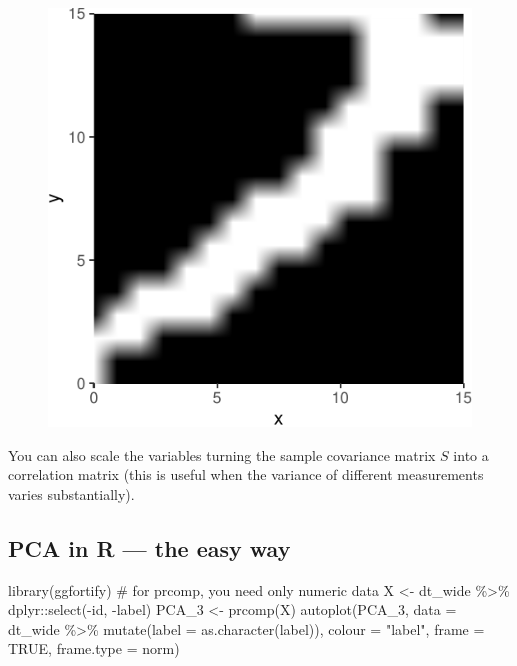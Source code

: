 \documentclass[
  letterpaper,
  DIV=11,
  numbers=noendperiod]{scrreprt}
\newenvironment{Shaded}{\begin{snugshade}}{\end{snugshade}}
\newcommand{\AttributeTok}[1]{\textcolor[rgb]{0.40,0.45,0.13}{#1}}
\newcommand{\CommentTok}[1]{\textcolor[rgb]{0.37,0.37,0.37}{#1}}
\newcommand{\ConstantTok}[1]{\textcolor[rgb]{0.56,0.35,0.01}{#1}}
\newcommand{\FunctionTok}[1]{\textcolor[rgb]{0.28,0.35,0.67}{#1}}
\newcommand{\NormalTok}[1]{\textcolor[rgb]{0.00,0.23,0.31}{#1}}
\newcommand{\OtherTok}[1]{\textcolor[rgb]{0.00,0.23,0.31}{#1}}
\newcommand{\SpecialCharTok}[1]{\textcolor[rgb]{0.37,0.37,0.37}{#1}}
\newcommand{\StringTok}[1]{\textcolor[rgb]{0.13,0.47,0.30}{#1}}
\begin{document}
\begin{figure}[H]

{\centering \includegraphics{./11-SVD_PCA_files/figure-pdf/unnamed-chunk-13-3.pdf}

}

\end{figure}

You can also scale the variables turning the sample covariance matrix
\(S\) into a correlation matrix (this is useful when the variance of
different measurements varies substantially).

\hypertarget{pca-in-r-the-easy-way}{%
\subsection{PCA in R --- the easy way}\label{pca-in-r-the-easy-way}}

\begin{Shaded}
\begin{Highlighting}[]
\FunctionTok{library}\NormalTok{(ggfortify)}
\CommentTok{\# for prcomp, you need only numeric data}
\NormalTok{X }\OtherTok{\textless{}{-}}\NormalTok{ dt\_wide }\SpecialCharTok{\%\textgreater{}\%}\NormalTok{ dplyr}\SpecialCharTok{::}\FunctionTok{select}\NormalTok{(}\SpecialCharTok{{-}}\NormalTok{id, }\SpecialCharTok{{-}}\NormalTok{label)}
\NormalTok{PCA\_3 }\OtherTok{\textless{}{-}} \FunctionTok{prcomp}\NormalTok{(X)}
\FunctionTok{autoplot}\NormalTok{(PCA\_3, }
         \AttributeTok{data =}\NormalTok{ dt\_wide }\SpecialCharTok{\%\textgreater{}\%} \FunctionTok{mutate}\NormalTok{(}\AttributeTok{label =} \FunctionTok{as.character}\NormalTok{(label)), }
         \AttributeTok{colour =} \StringTok{"label"}\NormalTok{,}
         \AttributeTok{frame =} \ConstantTok{TRUE}\NormalTok{, }\AttributeTok{frame.type =} \StringTok{\textquotesingle{}norm\textquotesingle{}}\NormalTok{)}
\end{Highlighting}
\end{Shaded}
\end{document}
